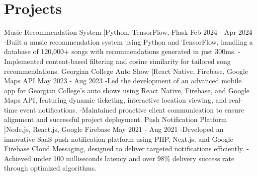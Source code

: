 \documentclass{article}%
\begin{document}
%
\section{Projects}%
\label{sec:Projects}%
Music Recommendation System |Python, TensorFlow, Flask Feb 2024 {-} Apr 2024 {-}Built a music recommendation system using Python and TensorFlow, handling a database of 120,000+ songs with recommendations generated in just 300ms. {-}Implemented content{-}based filtering and cosine similarity for tailored song recommendations. Georgian College Auto Show |React Native, Firebase, Google Maps API May 2023 {-} Aug 2023 {-}Led the development of an advanced mobile app for Georgian College’s auto shows using React Native, Firebase, and Google Maps API, featuring dynamic ticketing, interactive location viewing, and real{-}time event notifications. {-}Maintained proactive client communication to ensure alignment and successful project deployment. Push Notification Platform |Node.js, React.js, Google Firebase May 2021 {-} Aug 2021 {-}Developed an innovative SaaS push notification platform using PHP, Next.js, and Google Firebase Cloud Messaging, designed to deliver targeted notifications efficiently. {-}Achieved under 100 milliseconds latency and over 98\% delivery success rate through optimized algorithms.%
\linebreak

%
\end{document}
